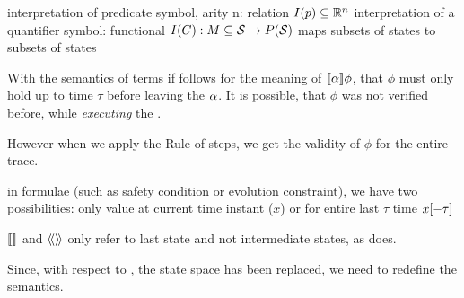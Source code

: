     interpretation of predicate symbol, arity n: relation $I(p)\subseteq\mathbb{R}^n$
    interpretation of a quantifier symbol: functional $I(C):M\subseteq\mathcal{S}\to P(\mathcal{S})$ maps subsets of states to subsets of states

    With the semantics of terms if follows for the meaning of $\dbox{\asprg}{\phi}$, that $\phi$ must only hold up to time $\tau$ before leaving the \HP $\alpha$. It is possible, that $\phi$ was not verified before, while \emph{executing} the \HP.

    However when we apply the Rule of steps, we get the validity of $\phi$ for the entire trace.

    in formulae (such as safety condition or evolution constraint), we have two possibilities: only value at current time instant ($x$) or for entire last $\tau$ time $x[-\tau]$

    $\dbox{}{}$ and $\ddiamond{}{}$ only refer to last state and not intermediate states, as \dTL does.

    Since, with respect to \dL, the state space has been replaced, we need to redefine the semantics.
    
